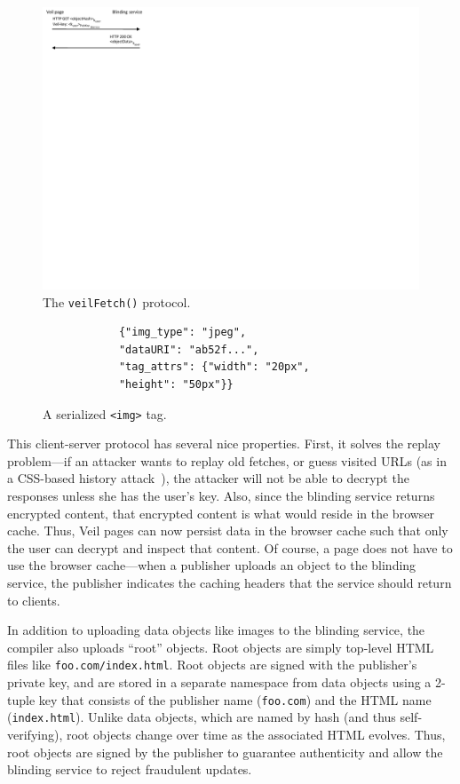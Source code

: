 \begin{figure}
	\centering
	\includegraphics{veil-figs/fetchProtocol_cropped}
	\caption{The \texttt{veilFetch()} protocol.}
	\label{fig:fetchProtocol}
\end{figure}

\begin{center}
\begin{figure}
		\begin{BVerbatim}
		    {"img_type": "jpeg",
		    "dataURI": "ab52f...",
		    "tag_attrs": {"width": "20px",
		    "height": "50px"}}
		\end{BVerbatim}	
	\caption{A serialized \texttt{<img>} tag.}
	\label{fig:imgJson}
\end{figure}
\end{center}

This client-server protocol has several nice
properties. First, it solves the replay
problem---if an attacker wants to replay
old fetches, or guess visited URLs (as in a
CSS-based history attack~\cite{cssHistoryAttack,cssHistoryAttack2}),
the attacker will not be able to decrypt the
responses unless she has the user's key. Also,
since the blinding service returns encrypted
content, that encrypted content is what would
reside in the browser cache. Thus, Veil pages
can now persist data in the browser cache
such that only the user can decrypt and inspect
that content. Of course, a page does not have
to use the browser cache---when a publisher
uploads an object to the blinding service,
the publisher indicates the caching headers that the
service should return to clients.

In addition to uploading data objects like
images to the blinding service, the compiler
also uploads ``root'' objects. Root objects
are simply top-level HTML files like \texttt{foo.com/index.html}.
Root objects are signed with the publisher's
private key, and are stored in a separate
namespace from data objects using a 2-tuple
key that consists of the publisher name
(\texttt{foo.com}) and the HTML name
(\texttt{index.html}). Unlike data objects,
which are named by hash (and thus self-verifying),
root objects change over time as the associated
HTML evolves. Thus, root objects are
signed by the publisher to guarantee
authenticity and allow the blinding service
to reject fraudulent updates.


